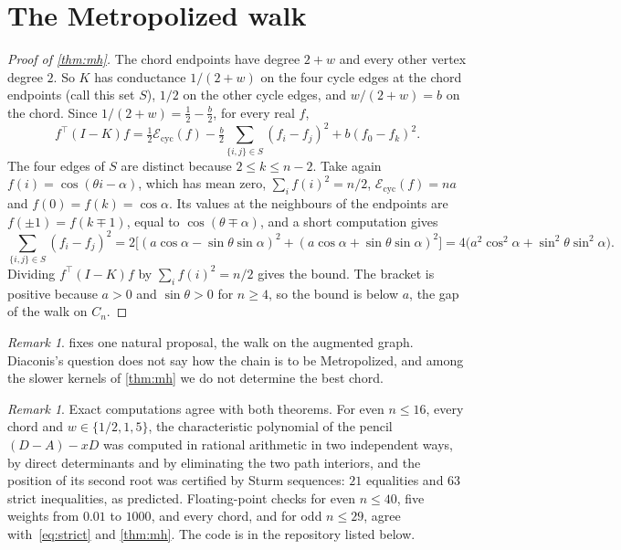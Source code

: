 \documentclass[11pt]{amsart}
\theoremstyle{remark}
\newtheorem{remark}[theorem]{Remark}
\begin{document}
\section{The Metropolized walk}

\begin{proof}[Proof of \cref{thm:mh}]
The chord endpoints have degree $2+w$ and every other vertex degree $2$. So $K$ has conductance $1/(2+w)$ on the four
cycle edges at the chord endpoints (call this set $S$), $1/2$ on the other cycle edges, and $w/(2+w)=b$ on the chord.
Since $1/(2+w)=\tfrac12-\tfrac b2$, for every real $f$,
\[
f^{\top}(I-K)f=\tfrac12\mathcal E_{\mathrm{cyc}}(f)-\tfrac b2\sum_{\{i,j\}\in S}(f_i-f_j)^2+b(f_0-f_k)^2 .
\]
The four edges of $S$ are distinct because $2\le k\le n-2$. Take again $f(i)=\cos(\theta i-\alpha)$, which has mean
zero, $\sum_if(i)^2=n/2$, $\mathcal E_{\mathrm{cyc}}(f)=na$ and $f(0)=f(k)=\cos\alpha$. Its values at the neighbours
of the endpoints are $f(\pm1)=f(k\mp1)$, equal to $\cos(\theta\mp\alpha)$, and a short computation gives
\[
\sum_{\{i,j\}\in S}(f_i-f_j)^2=2\bigl[(a\cos\alpha-\sin\theta\sin\alpha)^2+(a\cos\alpha+\sin\theta\sin\alpha)^2\bigr]
=4\bigl(a^2\cos^2\alpha+\sin^2\theta\sin^2\alpha\bigr).
\]
Dividing $f^{\top}(I-K)f$ by $\sum_if(i)^2=n/2$ gives the bound. The bracket is positive because $a>0$ and
$\sin\theta>0$ for $n\ge4$, so the bound is below $a$, the gap of the walk on $C_n$.
\end{proof}

\begin{remark}
 fixes one natural proposal, the walk on the augmented graph. Diaconis's question does not say how the chain is to be
Metropolized, and among the slower kernels of \cref{thm:mh} we do not determine the best chord.
\end{remark}

\begin{remark}
Exact computations agree with both theorems. For even $n\le16$, every chord and $w\in\{1/2,1,5\}$, the characteristic
polynomial of the pencil $(D-A)-xD$ was computed in rational arithmetic in two independent ways, by direct
determinants and by eliminating the two path interiors, and the position of its second root was certified by Sturm
sequences: $21$ equalities and $63$ strict inequalities, as predicted. Floating-point checks for even $n\le40$, five
weights from $0.01$ to $1000$, and every chord, and for odd $n\le29$, agree with~\eqref{eq:strict} and
\cref{thm:mh}. The code is in the repository listed below.
\end{remark}
\end{document}
